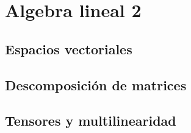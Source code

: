 \chapter{Algebra lineal 2}

\newpage
\section{Espacios vectoriales}

\newpage
\section{Descomposición de matrices}

\newpage
\section{Tensores y multilinearidad}